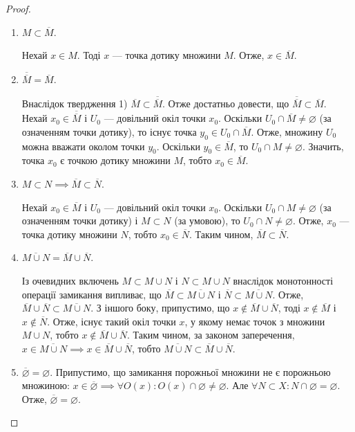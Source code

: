 \documentclass[a4paper, 12pt]{article}
\newcommand{\nothing}{$\left.\right.$}
\renewcommand{\emptyset}{\varnothing}
\begin{document}
\begin{proof}
	\nothing
	\begin{enumerate}
		\item $M \subset \overline{M}$. \smallskip

		Нехай $x \in M$. Тоді $x$ --- точка дотику множини $M$. Отже,
		$x \in \overline{M}$.

		\item $\overline{\overline{M}} = \overline{M}$. \smallskip

		Внаслідок твердження 1) $\overline{M} \subset \overline{\overline{M}}$. Отже достатньо
		довести, що $\overline{\overline{M}} \subset \overline{M}$. Нехай $x_0 \in \overline{\overline{M}}$ і $U_0$ --- довільний окіл
		точки $x_0$. Оскільки $U_0 \cap \overline{M} \ne \emptyset$ (за означенням точки
		дотику), то існує точка $y_0 \in U_0 \cap \overline{M}$. Отже, множину $U_0$
		можна вважати околом точки $y_0$. Оскільки $y_0 \in \overline{M}$, то
		$U_0 \cap M \ne \emptyset$. Значить, точка $x_0$ є точкою дотику
		множини $M$, тобто $x_0 \in \overline{M}$.

		\item $M \subset N \implies \overline{M} \subset \overline{N}$. \smallskip

		Нехай $x_0 \in \overline{M}$ і $U_0$ --- довільний окіл точки $x_0$. Оскільки
		$U_0 \cap M \ne \emptyset$ (за означенням точки дотику) і $M \subset N$ (за
		умовою), то $U_0 \cap N \ne \emptyset$. Отже, $x_0$ --- точка дотику
		множини $N$, тобто $x_0 \in \overline{N}$. Таким чином, $\overline{M} \subset \overline{N}$.

		\item $\overline{M \cup N} = \overline{M} \cup \overline{N}$. \smallskip

		Із очевидних включень $M \subset M \cup N$ і $N \subset M \cup N$
		внаслідок монотонності операції замикання випливає, що
		$\overline{M} \subset \overline{M \cup N}$ і $\overline{N} \subset \overline{M \cup N}$. Отже, $\overline{M} \cup \overline{N} \subset \overline{M \cup N}$. З іншого
		боку, припустимо, що $x \notin \overline{M} \cup \overline{N}$, тоді $x \notin \overline{M}$ і $x \notin \overline{N}$. Отже,
		існує такий окіл точки $x$, у якому немає точок з множини
		$M \cup N$, тобто $x \notin \overline{M} \cup \overline{N}$. Таким чином, за законом
		заперечення, $x \in \overline{M \cup N} \implies x \in \overline{M} \cup \overline{N}$, тобто
		$\overline{M \cup N} \subset \overline{M} \cup \overline{N}$.
		
		\item $\overline{\emptyset} = \emptyset$.
		Припустимо, що замикання порожньої множини не є
		порожньою множиною: $x \in \overline{\emptyset} \implies \forall O(x): O(x) \cap \emptyset \ne \emptyset$. Але
		$\forall N \subset X: N \cap \emptyset = \emptyset$. Отже, $\overline{\emptyset} = \emptyset$.
	\end{enumerate}
\end{proof}
\end{document}
